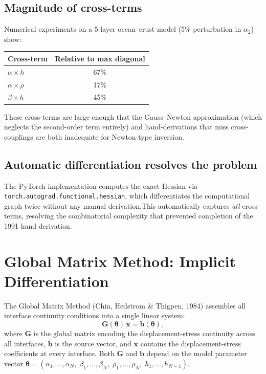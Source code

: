 \documentclass[11pt,a4paper]{article}
\theoremstyle{plain}
\theoremstyle{remark}
\begin{document}
\subsection{Magnitude of cross-terms}

Numerical experiments on a 5-layer ocean--crust model (5\% perturbation in
$\alpha_2$) show:
\begin{center}
\begin{tabular}{lc}
  \toprule
  \textbf{Cross-term} & \textbf{Relative to max diagonal}\\
  \midrule
  $\alpha\times h$ & 67\%\\
  $\alpha\times\rho$ & 17\%\\
  $\beta\times h$ & 45\%\\
  \bottomrule
\end{tabular}
\end{center}

\noindent These cross-terms are large enough that the Gauss--Newton
approximation (which neglects the second-order term entirely) and
hand-derivations that miss cross-couplings are both inadequate for
Newton-type inversion.

\subsection{Automatic differentiation resolves the problem}

The PyTorch implementation computes the exact Hessian via
\texttt{torch.autograd.functional.hessian}, which differentiates the
computational graph twice without any manual derivation.\linebreak  This automatically
captures \emph{all} cross-terms, resolving the combinatorial complexity that
prevented completion of the 1991 hand derivation.

\section{Global Matrix Method: Implicit Differentiation}\label{sec:gmm}

The Global Matrix Method (Chin, Hedstrom \& Thigpen, 1984) assembles
all interface continuity conditions into a single linear system:
\begin{equation}\label{eq:Gxb}
  \mathbf{G}(\bm{\theta})\,\mathbf{x} = \mathbf{b}(\bm{\theta}),
\end{equation}
where $\mathbf{G}$ is the global matrix encoding the displacement-stress
continuity across all interfaces, $\mathbf{b}$ is the source vector, and
$\mathbf{x}$ contains the displacement-stress coefficients at every
interface.  Both $\mathbf{G}$ and $\mathbf{b}$ depend on the model
parameter vector $\bm{\theta} = (\alpha_1,\dotsc,\alpha_N,\;
\beta_1,\dotsc,\beta_N,\; \rho_1,\dotsc,\rho_N,\;
h_1,\dotsc,h_{N-1})$.
\end{document}
